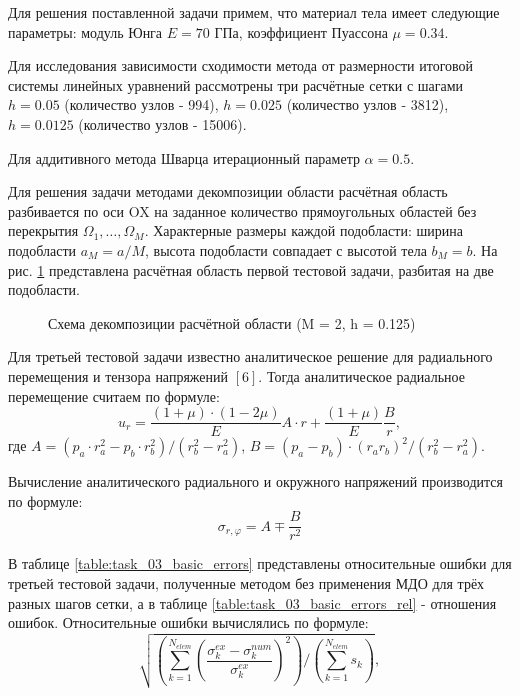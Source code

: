 \documentclass[a4paper, 14pt]{extarticle}
\newcommand{\area}{rectangle}
\newcommand{\task}{3_fixes}
\newcommand{\taskNum}{01}
\begin{document}
Для решения поставленной задачи примем, что материал тела имеет следующие параметры: модуль Юнга $E = 70$ ГПа, коэффициент Пуассона $\mu = 0.34$. 

Для исследования зависимости сходимости метода от размерности итоговой системы линейных уравнений рассмотрены три расчётные сетки с шагами $h = 0.05$ (количество узлов - 994), $h = 0.025$ (количество узлов - 3812), $h = 0.0125$ (количество узлов - 15006).

Для аддитивного метода Шварца итерационный параметр $\alpha = 0.5$.

\newpage

Для решения задачи методами декомпозиции области расчётная область разбивается по оси OX на заданное количество прямоугольных областей без перекрытия $\Omega_1, \ldots, \Omega_M$. Характерные размеры каждой подобласти: ширина подобласти $a_M = a / M$, высота подобласти совпадает с высотой тела $b_M = b$. На рис. \ref{fig:task_\taskNum_decomposition} представлена расчётная область первой тестовой задачи, разбитая на две подобласти.

\begin{figure}[h]
\caption{Схема декомпозиции расчётной области (M = 2, h = 0.125)}
\label{fig:task_\taskNum_decomposition}
\end{figure}

\newpage

Для третьей тестовой задачи известно аналитическое решение для радиального перемещения и тензора напряжений $\left[6\right]$. Тогда аналитическое радиальное перемещение считаем по формуле:
\begin{equation*}
u_r = \frac{(1 + \mu) \cdot (1 - 2\mu)}{E}A \cdot r + \frac{(1 + \mu)}{E} \frac{B}{r},
\end{equation*}
где $A = (p_a \cdot r_a^2 - p_b \cdot r_b^2) / (r_b^2 - r_a^2)$, $B = (p_a - p_b) \cdot (r_a r_b)^2 / (r_b^2 - r_a^2)$.

Вычисление аналитического радиального и окружного напряжений производится по формуле:
\begin{equation*}
\sigma_{r, \varphi} = A \mp \frac{B}{r^2}
\end{equation*}

В таблице \ref{table:task_03_basic_errors} представлены относительные ошибки для третьей тестовой задачи, полученные методом без применения МДО для трёх разных шагов сетки, а в таблице \ref{table:task_03_basic_errors_rel} - отношения ошибок. Относительные ошибки вычислялись по формуле:
\begin{equation*}
\sqrt{\left(\sum_{k = 1}^{N_{elem}} {\left(\frac{\sigma_k^{ex} - \sigma_k^{num}}{\sigma_k^{ex}}\right)^2}\right) / \left(\sum_{k=1}^{N_{elem}} {s_k}\right)},
\end{equation*}
\end{document}
